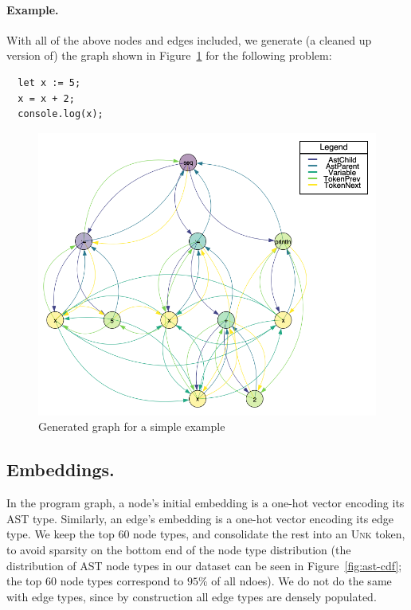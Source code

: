 \paragraph{Example.}
With all of the above nodes and edges included, we generate (a cleaned up version of) the graph shown in Figure~\ref{fig:ast-graph} for the following problem:
\begin{lstlisting}
  let x := 5;
  x = x + 2;
  console.log(x);
\end{lstlisting}

\begin{figure}
  \centering
  \includegraphics[width=\linewidth]{img/gen_graph}
  \caption{Generated graph for a simple example}
  \label{fig:ast-graph}
\end{figure}

\subsection{Embeddings.}

In the program graph, a node's initial embedding is a one-hot vector encoding its AST type.
Similarly, an edge's embedding is a one-hot vector encoding its edge type.
We keep the top 60 node types, and consolidate the rest into an \textsc{Unk} token, to avoid sparsity on the bottom end of the node type distribution (the distribution of AST node types in our dataset can be seen in Figure~\ref{fig:ast-cdf}; the top 60 node types correspond to $95\%$ of all ndoes).
We do not do the same with edge types, since by construction all edge types are densely populated.

